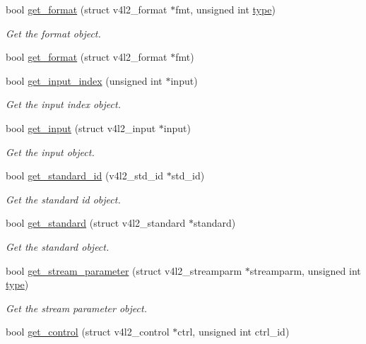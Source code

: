 \begin{DoxyCompactItemize}
bool \hyperlink{classv4lcap_aa5c521438e06e14625c05a02bafd35c1}{get\+\_\+format} (struct v4l2\+\_\+format $\ast$fmt, unsigned int \hyperlink{classstd_1_1conditional_1_1type}{type})
\begin{DoxyCompactList}\small\item\em Get the format object. \end{DoxyCompactList}\item 
bool \hyperlink{classv4lcap_a1964262e616b7624fdef18d54ea211e4}{get\+\_\+format} (struct v4l2\+\_\+format $\ast$fmt)
\item 
bool \hyperlink{classv4lcap_ad6cf8417903c40e86a087a236cd39337}{get\+\_\+input\+\_\+index} (unsigned int $\ast$input)
\begin{DoxyCompactList}\small\item\em Get the input index object. \end{DoxyCompactList}\item 
bool \hyperlink{classv4lcap_a11e01d9043a7cb3537a772cc3a5bacb5}{get\+\_\+input} (struct v4l2\+\_\+input $\ast$input)
\begin{DoxyCompactList}\small\item\em Get the input object. \end{DoxyCompactList}\item 
bool \hyperlink{classv4lcap_a3db79824d21927b3057c87d19e873498}{get\+\_\+standard\+\_\+id} (v4l2\+\_\+std\+\_\+id $\ast$std\+\_\+id)
\begin{DoxyCompactList}\small\item\em Get the standard id object. \end{DoxyCompactList}\item 
bool \hyperlink{classv4lcap_ad3ae859cc6d6d99146619ba550514aab}{get\+\_\+standard} (struct v4l2\+\_\+standard $\ast$standard)
\begin{DoxyCompactList}\small\item\em Get the standard object. \end{DoxyCompactList}\item 
bool \hyperlink{classv4lcap_a067a6b97d6c4d3ea83454132f1d3c87e}{get\+\_\+stream\+\_\+parameter} (struct v4l2\+\_\+streamparm $\ast$streamparm, unsigned int \hyperlink{classstd_1_1conditional_1_1type}{type})
\begin{DoxyCompactList}\small\item\em Get the stream parameter object. \end{DoxyCompactList}\item 
bool \hyperlink{classv4lcap_affd6d918400a56e165d7a3e4fab8bdae}{get\+\_\+control} (struct v4l2\+\_\+control $\ast$ctrl, unsigned int ctrl\+\_\+id)

\end{DoxyCompactItemize}
